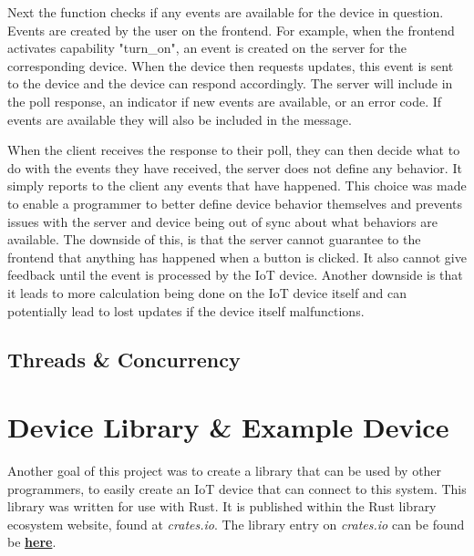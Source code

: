 Next the function checks if any events are available for the device in question. Events are created by the user on the frontend. For example, when the frontend activates capability "turn\_on", an event is created on the server for the corresponding device. When the device then requests updates, this event is sent to the device and the device can respond accordingly. The server will include in the poll response, an indicator if new events are available, or an error code. If events are available they will also be included in the message.

When the client receives the response to their poll, they can then decide what to do with the events they have received, the server does not define any behavior. It simply reports to the client any events that have happened. This choice was made to enable a programmer to better define device behavior themselves and prevents issues with the server and device being out of sync about what behaviors are available. The downside of this, is that the server cannot guarantee to the frontend that anything has happened when a button is clicked. It also cannot give feedback until the event is processed by the IoT device. Another downside is that it leads to more calculation being done on the IoT device itself and can potentially lead to lost updates if the device itself malfunctions.


\subsection{Threads \& Concurrency} \label{sec:chapimpl:server:threads}

\section{Device Library \& Example Device} \label{sec:chapimpl:devicelib}
Another goal of this project was to create a library that can be used by other programmers, to easily create an IoT device that can connect to this system. This library was written for use with Rust. It is published within the Rust library ecosystem website, found at \textit{crates.io}. The library entry on \textit{crates.io} can be found be \textbf{\href{https://crates.io/crates/NOSHP-Client}{here}}. 

